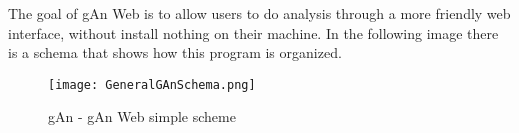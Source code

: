 The goal of gAn Web is to allow users to do analysis through a more friendly web interface, without install nothing on their machine. In the following image there is a schema that shows how this program is organized.

\begin{figure}[H]
\centering
\texttt{[image: GeneralGAnSchema.png]} 
\caption{gAn - gAn Web simple scheme}
\end{figure}



